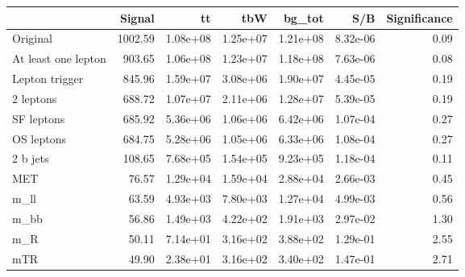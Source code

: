 \begin{tabular}{lrrrrrr}
\toprule
{} &   Signal &        tt &       tbW &    bg_tot &       S/B &  Significance \\
\midrule
Original            &  1002.59 &  1.08e+08 &  1.25e+07 &  1.21e+08 &  8.32e-06 &          0.09 \\
At least one lepton &   903.65 &  1.06e+08 &  1.23e+07 &  1.18e+08 &  7.63e-06 &          0.08 \\
Lepton trigger      &   845.96 &  1.59e+07 &  3.08e+06 &  1.90e+07 &  4.45e-05 &          0.19 \\
2 leptons           &   688.72 &  1.07e+07 &  2.11e+06 &  1.28e+07 &  5.39e-05 &          0.19 \\
SF leptons          &   685.92 &  5.36e+06 &  1.06e+06 &  6.42e+06 &  1.07e-04 &          0.27 \\
OS leptons          &   684.75 &  5.28e+06 &  1.05e+06 &  6.33e+06 &  1.08e-04 &          0.27 \\
2 b jets            &   108.65 &  7.68e+05 &  1.54e+05 &  9.23e+05 &  1.18e-04 &          0.11 \\
MET                 &    76.57 &  1.29e+04 &  1.59e+04 &  2.88e+04 &  2.66e-03 &          0.45 \\
m_ll                &    63.59 &  4.93e+03 &  7.80e+03 &  1.27e+04 &  4.99e-03 &          0.56 \\
m_bb                &    56.86 &  1.49e+03 &  4.22e+02 &  1.91e+03 &  2.97e-02 &          1.30 \\
m_R                 &    50.11 &  7.14e+01 &  3.16e+02 &  3.88e+02 &  1.29e-01 &          2.55 \\
mTR                 &    49.90 &  2.38e+01 &  3.16e+02 &  3.40e+02 &  1.47e-01 &          2.71 \\
\bottomrule
\end{tabular}
